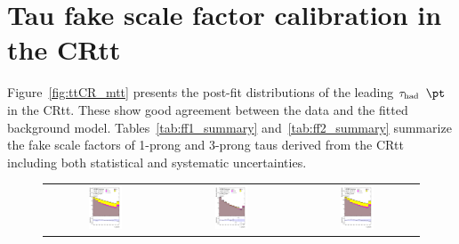 \section{Tau fake scale factor calibration in the CRtt}
\label{sec:tauFF_appendix}

Figure~\ref{fig:ttCR_mtt} presents the post-fit distributions of the leading $\tau_\text{had}$ $\pt$ in the CRtt. These show good agreement between the data and the fitted background model.
Tables~\ref{tab:ff1_summary} and~\ref{tab:ff2_summary} summarize the fake scale factors of 1-prong and 3-prong taus
derived from the CRtt including both statistical and systematic uncertainties. 

\begin{figure}[H]
\centering
\begin{tabular}{@{}ccc@{}}
\includegraphics[page=1,width=0.29\textwidth]{figures/ttCR/tuH_reg1l1tau2b2j_os_log_ttCR.pdf} &
\includegraphics[page=1,width=0.29\textwidth]{figures/ttCR/tuH_reg1l1tau2b2j_ss_log_ttCR.pdf}&
\includegraphics[page=1,width=0.29\textwidth]{figures/ttCR/tuH_reg1l1tau2b3j_os_log_ttCR.pdf}\\

\end{tabular}
\end{figure}
